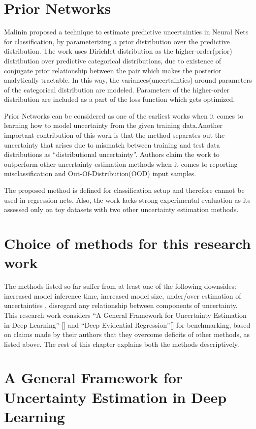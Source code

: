 	\section{Prior Networks}
	Malinin  proposed a technique to estimate predictive uncertainties in Neural Nets for classification, by parameterizing a prior distribution over the predictive distribution. The work uses Dirichlet distribution as the higher-order(prior) distribution over predictive categorical distributions, due to existence of  conjugate prior relationship between the pair which makes the posterior analytically tractable. In this way, the variances(uncertainties) around parameters of the categorical distribution are modeled. Parameters of the higher-order distribution are included as a part of the loss function which gets optimized.
	
	 Prior Networks can be considered as one of the earliest works when it comes to learning how to model uncertainty from the given training data.Another important contribution of this work is that the method separates out the uncertainty that arises due to mismatch between training and test data distributions as \enquote{distributional uncertainty}. Authors claim the work to outperform other uncertainty estimation methods when it comes to reporting misclassification and Out-Of-Distribution(OOD) input samples.
	
	
	The proposed method is defined for classification setup and therefore cannot be used in regression nets. Also, the work lacks strong experimental evaluation as its assessed only on toy datasets with two other uncertainty estimation methods.
	
	\section{Choice of methods for this research work}
	The methods listed so far suffer from at least one of the following downsides: increased model inference time, increased model size, under/over estimation of uncertainties , disregard any relationship between components of uncertainty. This research work considers \enquote{A General Framework for Uncertainty Estimation in Deep Learning} [\cite{loquercio2020a}] and \enquote{Deep Evidential Regression}[\cite{amini2020deep}] for benchmarking, based on claims made by their authors that they overcome deficits of other methods, as listed above. The rest of this chapter explains both the methods descriptively.
	\section{A General Framework for Uncertainty Estimation in Deep Learning}\label{general_framework}
